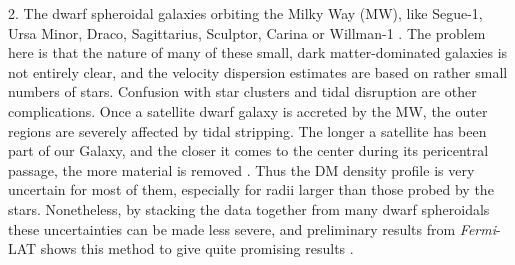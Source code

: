 \documentclass[10pt,aps,pra,reprint,amsmath,amsfonts,amssymb,showpacs,nofootinbib,floatfix]{revtex4-1}
\newcommand{\Fermi}{{\em Fermi}\xspace}
\begin{document}
2. The dwarf spheroidal galaxies orbiting the Milky Way (MW), like Segue-1, Ursa
Minor, Draco, Sagittarius, Sculptor, Carina or Willman-1
\cite{2009JCAP...01..016B,2010ApJ...720.1174A,2010JCAP...01..031S,2010JCAP...01..031S,2011arXiv1103.0477T,2011APh....34..608H}. The
problem here is that the nature of many of these small, dark matter-dominated
galaxies is not entirely clear, and the velocity dispersion estimates are based
on rather small numbers of stars.  Confusion with star clusters and tidal
disruption are other complications. Once a satellite dwarf galaxy is accreted by
the MW, the outer regions are severely affected by tidal stripping. The longer a
satellite has been part of our Galaxy, and the closer it comes to the center
during its pericentral passage, the more material is removed
\cite{2004MNRAS.355..819G}.  Thus the DM density profile is very uncertain for
most of them, especially for radii larger than those probed by the
stars. Nonetheless, by stacking the data together from many dwarf spheroidals
these uncertainties can be made less severe, and preliminary results from
\Fermi-LAT shows this method to give quite promising results \cite{garde}.

\end{document}
